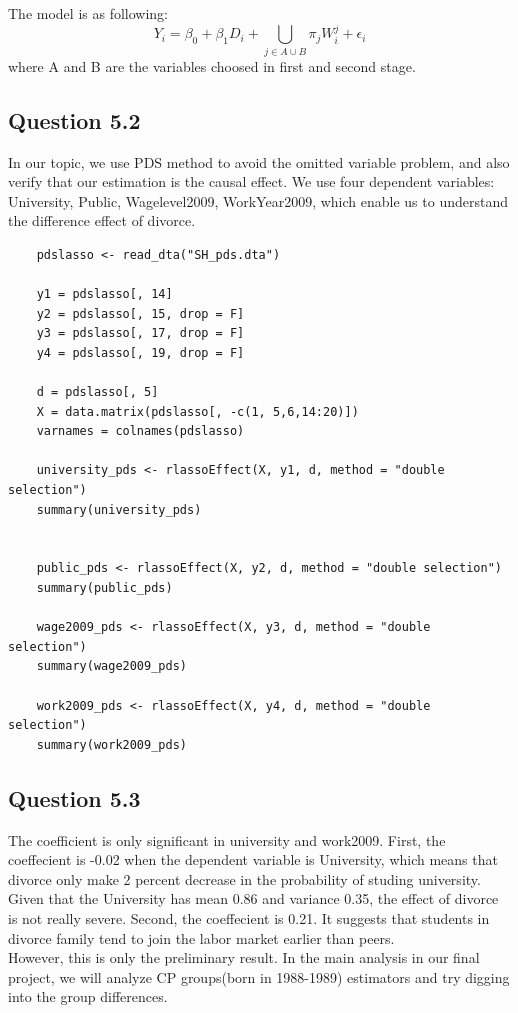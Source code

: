 \documentclass[11pt, letterpaper]{article}
\begin{document}
The model is as following:
\[
Y_i = \beta_0 + \beta_1 D_i + \bigcup_{j \in A \cup B} \pi_j W_i^j + \epsilon_i
\]
where A and B are the variables choosed in first and second stage.


\subsection*{Question 5.2}

In our topic, we use PDS method to avoid the omitted variable problem, and also verify that our estimation is the causal effect.
We use four dependent variables: University, Public, Wagelevel2009, WorkYear2009, which enable us to understand the difference effect of divorce. 

\begin{lstlisting}
    pdslasso <- read_dta("SH_pds.dta")

    y1 = pdslasso[, 14]
    y2 = pdslasso[, 15, drop = F]
    y3 = pdslasso[, 17, drop = F]
    y4 = pdslasso[, 19, drop = F]
    
    d = pdslasso[, 5]
    X = data.matrix(pdslasso[, -c(1, 5,6,14:20)])
    varnames = colnames(pdslasso)
    
    university_pds <- rlassoEffect(X, y1, d, method = "double selection")
    summary(university_pds)
    
    
    public_pds <- rlassoEffect(X, y2, d, method = "double selection")
    summary(public_pds)
    
    wage2009_pds <- rlassoEffect(X, y3, d, method = "double selection")
    summary(wage2009_pds)
    
    work2009_pds <- rlassoEffect(X, y4, d, method = "double selection")
    summary(work2009_pds)

\end{lstlisting}

\subsection*{Question 5.3}

The coefficient is only significant in university and work2009.
First, the coeffecient is -0.02 when the dependent variable is University, which means that divorce only make 2 percent decrease in the probability of studing university.
Given that the University has mean 0.86 and variance 0.35, the effect of divorce is not really severe. 
Second, the coeffecient is 0.21. It suggests that students in divorce family tend to join the labor market earlier than peers. \\

However, this is only the preliminary result.
In the main analysis in our final project, we will analyze CP groups(born in 1988-1989) estimators and try digging into the group differences. 
\end{document}
